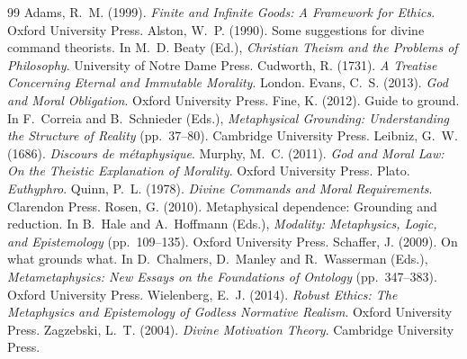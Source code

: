 \documentclass{situationist-preprint}
\begin{document}
\begin{thebibliography}{99}\small
{} Adams, R.~M. (1999). \emph{Finite and Infinite Goods: A Framework for Ethics}. Oxford University Press.
 Alston, W.~P. (1990). Some suggestions for divine command theorists. In M.~D. Beaty (Ed.), \emph{Christian Theism and the Problems of Philosophy}. University of Notre Dame Press.
 Cudworth, R. (1731). \emph{A Treatise Concerning Eternal and Immutable Morality}. London.
 Evans, C.~S. (2013). \emph{God and Moral Obligation}. Oxford University Press.
 Fine, K. (2012). Guide to ground. In F.~Correia and B.~Schnieder (Eds.), \emph{Metaphysical Grounding: Understanding the Structure of Reality} (pp.~37--80). Cambridge University Press.
 Leibniz, G.~W. (1686). \emph{Discours de métaphysique}.
 Murphy, M.~C. (2011). \emph{God and Moral Law: On the Theistic Explanation of Morality}. Oxford University Press.
 Plato. \emph{Euthyphro}.
 Quinn, P.~L. (1978). \emph{Divine Commands and Moral Requirements}. Clarendon Press.
 Rosen, G. (2010). Metaphysical dependence: Grounding and reduction. In B.~Hale and A.~Hoffmann (Eds.), \emph{Modality: Metaphysics, Logic, and Epistemology} (pp.~109--135). Oxford University Press.
 Schaffer, J. (2009). On what grounds what. In D.~Chalmers, D.~Manley and R.~Wasserman (Eds.), \emph{Metametaphysics: New Essays on the Foundations of Ontology} (pp.~347--383). Oxford University Press.
 Wielenberg, E.~J. (2014). \emph{Robust Ethics: The Metaphysics and Epistemology of Godless Normative Realism}. Oxford University Press.
 Zagzebski, L.~T. (2004). \emph{Divine Motivation Theory}. Cambridge University Press.
\end{thebibliography}
\end{document}
